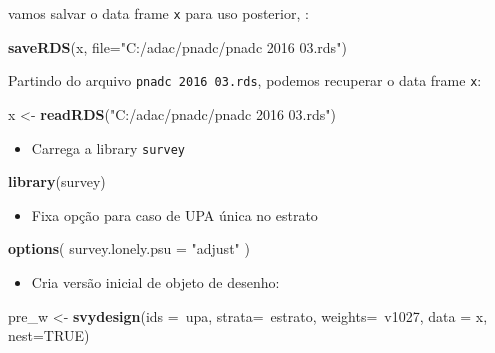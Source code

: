 \documentclass[]{book}
\newenvironment{Shaded}{\begin{snugshade}}{\end{snugshade}}
\newcommand{\KeywordTok}[1]{\textcolor[rgb]{0.13,0.29,0.53}{\textbf{{#1}}}}
\newcommand{\DataTypeTok}[1]{\textcolor[rgb]{0.13,0.29,0.53}{{#1}}}
\newcommand{\StringTok}[1]{\textcolor[rgb]{0.31,0.60,0.02}{{#1}}}
\newcommand{\OtherTok}[1]{\textcolor[rgb]{0.56,0.35,0.01}{{#1}}}
\newcommand{\NormalTok}[1]{{#1}}
\providecommand{\tightlist}{%
  \setlength{\itemsep}{0pt}\setlength{\parskip}{0pt}}
\theoremstyle{definition}
\theoremstyle{definition}
\theoremstyle{remark}
\begin{document}
vamos salvar o data frame \texttt{x} para uso posterior, :

\begin{Shaded}
\begin{Highlighting}[]
\KeywordTok{saveRDS}\NormalTok{(x, }\DataTypeTok{file=}\StringTok{"C:/adac/pnadc/pnadc 2016 03.rds"}\NormalTok{)}
\end{Highlighting}
\end{Shaded}

Partindo do arquivo \texttt{pnadc\ 2016\ 03.rds}, podemos recuperar o
data frame \texttt{x}:

\begin{Shaded}
\begin{Highlighting}[]
\NormalTok{x <-}\StringTok{ }\KeywordTok{readRDS}\NormalTok{(}\StringTok{"C:/adac/pnadc/pnadc 2016 03.rds"}\NormalTok{)}
\end{Highlighting}
\end{Shaded}

\begin{itemize}
\tightlist
\item
  Carrega a library \texttt{survey}
\end{itemize}

\begin{Shaded}
\begin{Highlighting}[]
\KeywordTok{library}\NormalTok{(survey)}
\end{Highlighting}
\end{Shaded}

\begin{itemize}
\tightlist
\item
  Fixa opção para caso de UPA única no estrato
\end{itemize}

\begin{Shaded}
\begin{Highlighting}[]
\KeywordTok{options}\NormalTok{( }\DataTypeTok{survey.lonely.psu =} \StringTok{"adjust"} \NormalTok{)}
\end{Highlighting}
\end{Shaded}

\begin{itemize}
\tightlist
\item
  Cria versão inicial de objeto de desenho:
\end{itemize}

\begin{Shaded}
\begin{Highlighting}[]
\NormalTok{pre_w <-}\StringTok{ }\KeywordTok{svydesign}\NormalTok{(}\DataTypeTok{ids =}\NormalTok{~upa, }\DataTypeTok{strata=}\NormalTok{~estrato, }
  \DataTypeTok{weights=}\NormalTok{~v1027, }\DataTypeTok{data =} \NormalTok{x, }\DataTypeTok{nest=}\OtherTok{TRUE}\NormalTok{)}
\end{Highlighting}
\end{Shaded}
\end{document}
